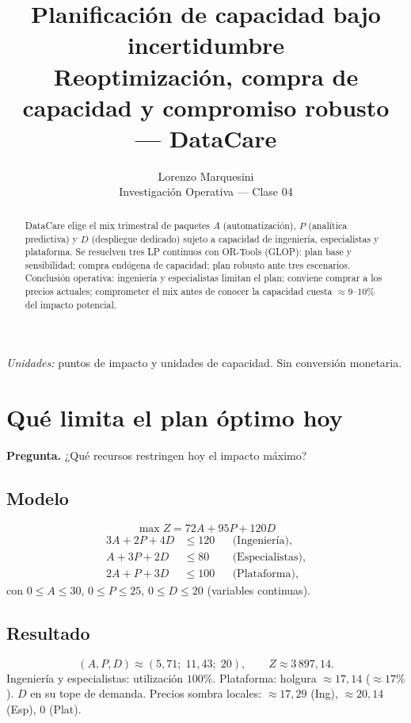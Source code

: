 \documentclass[11pt,a4paper]{article}
\title{\bfseries Planificación de capacidad bajo incertidumbre\\
\large Reoptimización, compra de capacidad y compromiso robusto --- DataCare}
\author{Lorenzo Marquesini\\[0.25em]
\small Investigación Operativa --- Clase 04}
\date{}
\newcommand{\pregunta}[1]{\noindent\textbf{Pregunta.} #1\par}
\begin{document}
\vspace{-0.6em}
\maketitle
\vspace{-1.4em}

\begin{abstract}
\noindent
DataCare elige el mix trimestral de paquetes $A$ (automatización), $P$ (analítica predictiva) y $D$ (despliegue dedicado) sujeto a capacidad de ingeniería, especialistas y plataforma. Se resuelven tres LP continuos con OR-Tools (GLOP): plan base y sensibilidad; compra endógena de capacidad; plan robusto ante tres escenarios. Conclusión operativa: ingeniería y especialistas limitan el plan; conviene comprar a los precios actuales; comprometer el mix antes de conocer la capacidad cuesta $\approx 9$--$10\%$ del impacto potencial.
\end{abstract}

\noindent\textit{Unidades:} puntos de impacto y unidades de capacidad. Sin conversión monetaria.

\section{Qué limita el plan óptimo hoy}

\pregunta{¿Qué recursos restringen hoy el impacto máximo?}

\subsection*{Modelo}
\begin{equation}
\max Z = 72A + 95P + 120D
\end{equation}
\begin{align}
3A + 2P + 4D &\le 120 && \text{(Ingeniería)},\\
A + 3P + 2D &\le 80 && \text{(Especialistas)},\\
2A + P + 3D &\le 100 && \text{(Plataforma)},
\end{align}
con $0\le A\le 30$, $0\le P\le 25$, $0\le D\le 20$ (variables continuas).

\subsection*{Resultado}
\[
(A,P,D)\approx(5{,}71;\;11{,}43;\;20),\qquad Z\approx 3\,897{,}14.
\]
Ingeniería y especialistas: utilización $100\%$. Plataforma: holgura $\approx 17{,}14$ ($\approx 17\%$). $D$ en su tope de demanda. Precios sombra locales: $\approx 17{,}29$ (Ing), $\approx 20{,}14$ (Esp), $0$ (Plat).
\end{document}
